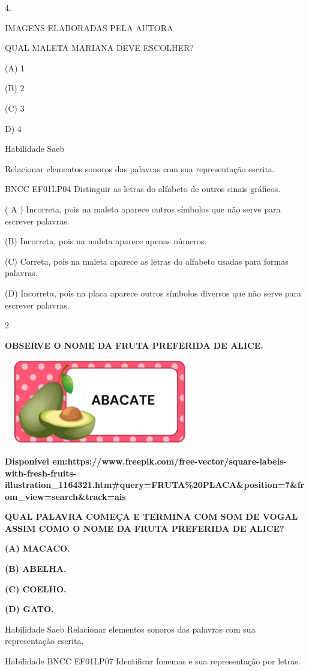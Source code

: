\begin{escola}
4.

IMAGENS ELABORADAS PELA AUTORA

QUAL MALETA MARIANA DEVE ESCOLHER?

(A) 1

(B) 2

(C) 3

D) 4

Habilidade Saeb

Relacionar elementos sonoros das palavras com sua representação escrita.

BNCC EF01LP04 Distinguir as letras do alfabeto de outros sinais
gráficos.

( A ) Incorreta, pois na maleta aparece outros símbolos que não serve
para escrever palavras.

(B) Incorreta, pois na maleta aparece apenas números.

(C) Correta, pois na maleta aparece as letras do alfabeto usadas para
formas palavras.

(D) Incorreta, pois na placa aparece outros símbolos diversos que não
serve para escrever palavras.

\num{2}

\textbf{OBSERVE O NOME DA FRUTA PREFERIDA DE ALICE.}

\includegraphics[width=3.32292in,height=1.46928in]{media/image212.png}

\textbf{Disponível
em:https://www.freepik.com/free-vector/square-labels-with-fresh-fruits-illustration\_1164321.htm\#query=FRUTA\%20PLACA\&position=7\&from\_view=search\&track=ais}

\textbf{QUAL PALAVRA COMEÇA E TERMINA COM SOM DE VOGAL ASSIM COMO O NOME
DA FRUTA PREFERIDA DE ALICE?}

\textbf{(A) MACACO.}

\textbf{(B) ABELHA.}

\textbf{(C) COELHO.}

\textbf{(D) GATO.}

Habilidade Saeb Relacionar elementos sonoros das palavras com sua
representação escrita.

Habilidade BNCC EF01LP07 Identificar fonemas e sua representação por
letras.


\end{escola}
